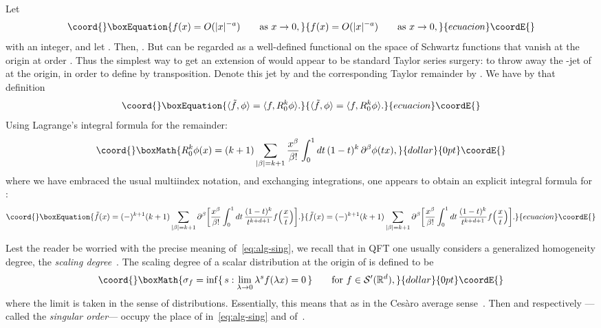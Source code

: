 \documentclass[a4paper,12pt]{article}
\renewcommand{\b}{\beta}           %
\providecommand{\del}{\partial}        %
\providecommand{\la}{\lambda}          %
\providecommand{\loc}{{\mathrm{loc}}}  %
\providecommand{\R}{\mathbb{R}}        %
\providecommand{\set}[1]{\{\,#1\,\}}   %
\renewcommand{\SS}{\mathcal{S}}    %
\providecommand{\7}{\dagger}           %
\def\<#1,#2>{\langle#1,#2\rangle}  %
\theoremstyle{plain}
\theoremstyle{definition}
\begin{document}
Let
\begin{equation}\coord{}\boxEquation{
f(x) = O(|x|^{-a}) \qquad\mbox{as } x \to 0,
\label{eq:alg-sing}
}{
f(x) = O(|x|^{-a}) \qquad\mbox{as } x \to 0,
}{ecuacion}\coordE{}\end{equation}
with \coordHE{} an integer, and let \coordHE{}. Then,
\myHighlight{$f \notin L_\loc^1(\R^d)$}\coordHE{}. But \coordHE{} can be regarded as a well-defined
functional on the space \myHighlight{$\SS_{k+1}(\R^d)$}\coordHE{} of Schwartz functions that
vanish at the origin at order \coordHE{}. Thus the simplest way to get an
extension of \coordHE{} would appear to be standard Taylor series surgery: to
throw away the \coordHE{}-jet of \myHighlight{$\phi$}\coordHE{} at the origin, in order to define
\coordHE{} by transposition. Denote this jet by \coordHE{} and the
corresponding Taylor remainder by \coordHE{}. We have by that
definition
\begin{equation}\coord{}\boxEquation{
\<\tilde f, \phi> = \<f, R^k_0\phi>.
\label{eq:bas-def}
}{
\<\tilde f, \phi> = \<f, R^k_0\phi>.
}{ecuacion}\coordE{}\end{equation}
Using Lagrange's integral formula for the remainder:
$$\coord{}\boxMath{
R^k_0\phi(x) = (k+1) \sum_{|\b|=k+1}\frac{x^\b}{\b!}
\int_0^1 dt\, (1-t)^k\,\del^\b\phi(tx),
}{dollar}{0pt}\coordE{}$$
where we have embraced the usual multiindex notation, and exchanging
integrations, one appears to obtain an explicit integral formula for
\coordHE{}:
\begin{equation}\coord{}\boxEquation{
\tilde f(x) = (-)^{k+1} (k+1) \sum_{|\b|=k+1}
\del^\b \biggl[\frac{x^\b}{\b!} \int_0^1 dt\,\frac{(1-t)^k}{t^{k+d+1}}
f\Bigl(\frac{x}{t}\Bigr) \biggr].
\label{eq:bas-Lagr}
}{
\tilde f(x) = (-)^{k+1} (k+1) \sum_{|\b|=k+1}
\del^\b \biggl[\frac{x^\b}{\b!} \int_0^1 dt\,\frac{(1-t)^k}{t^{k+d+1}}
f\Bigl(\frac{x}{t}\Bigr) \biggr].
}{ecuacion}\coordE{}\end{equation}

Lest the reader be worried with the precise meaning
of~\eqref{eq:alg-sing}, we recall that in QFT one usually considers a
generalized homogeneity degree, the \textit{scaling degree}~\cite{OS}.
The scaling degree \myHighlight{$\sigma$}\coordHE{} of a scalar distribution \coordHE{} at the origin
of \myHighlight{$\R^d$}\coordHE{} is defined to be
$$\coord{}\boxMath{
\sigma_f = \inf \set{s : \lim_{\la\to 0} \la^s f(\la x) = 0}
\qquad\mbox{for } f\in \SS'(\R^d),
}{dollar}{0pt}\coordE{}$$
where the limit is taken in the sense of distributions. Essentially,
this means that \coordHE{} as \coordHE{} in the
Ces\`aro average sense~\cite{Ricardo}. Then \myHighlight{$[\sigma_f]$}\coordHE{} and
respectively \coordHE{} ---called the \textit{singular order}---
occupy the place of \coordHE{} in~\eqref{eq:alg-sing} and of~\coordHE{}.
\end{document}
